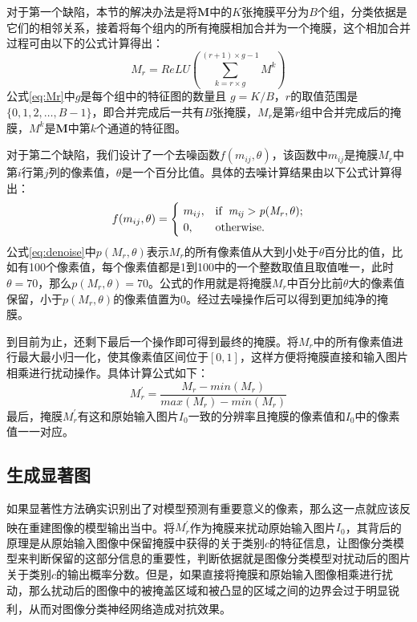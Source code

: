 对于第一个缺陷，本节的解决办法是将$\boldsymbol{M}$中的$K$张掩膜平分为$B$个组，分类依据是它们的相邻关系，接着将每个组内的所有掩膜相加合并为一个掩膜，这个相加合并过程可由以下的公式计算得出：
\begin{equation}
	M_r=ReLU(\sum_{k=r\times g}^{(r+1)\times g-1}{M^k})
	\label{eq:Mr}
\end{equation}
公式\ref{eq:Mr}中$g$是每个组中的特征图的数量且 $g=K/B$，$r$的取值范围是$\{0,1,2,\dots,B-1\}$，即合并完成后一共有$B$张掩膜，$M_r$是第$r$组中合并完成后的掩膜，$M^k$是$\boldsymbol{M}$中第$k$个通道的特征图。

对于第二个缺陷，我们设计了一个去噪函数$f(m_{ij},\theta)$，该函数中$m_{ij}$是掩膜$M_r$中第$i$行第$j$列的像素值，$\theta$是一个百分比值。具体的去噪计算结果由以下公式计算得出：
\begin{equation}
	f(m_{ij},\theta)= \begin{cases}
		\ m_{ij}, & \rm if \enspace \it m_{ij}>p(M_r,\theta) ; \\
		\ 0, & \rm otherwise .\\
	\end{cases}
\label{eq:denoise}
\end{equation}
公式\ref{eq:denoise}中$p(M_r,\theta)$表示$M_r$的所有像素值从大到小处于$\theta$百分比的值，比如有100个像素值，每个像素值都是1到100中的一个整数取值且取值唯一，此时$\theta =70$，那么$p(M_r,\theta)=70$。公式的作用就是将掩膜$M_r$中百分比前$\theta$大的像素值保留，小于$p(M_r,\theta)$的像素值置为0。经过去噪操作后可以得到更加纯净的掩膜。

到目前为止，还剩下最后一个操作即可得到最终的掩膜。将$M_r$中的所有像素值进行最大最小归一化，使其像素值区间位于$[0,1]$，这样方便将掩膜直接和输入图片相乘进行扰动操作。具体计算公式如下：
\begin{equation}
	M^{\prime}_r=\frac{M_r-min(M_r)}{max(M_r)-min(M_r)}\label{e_minmax}
\end{equation}
最后，掩膜$M^{\prime}_r$有这和原始输入图片$I_0$一致的分辨率且掩膜的像素值和$I_0$中的像素值一一对应。

\subsection{生成显著图}
如果显著性方法确实识别出了对模型预测有重要意义的像素，那么这一点就应该反映在重建图像的模型输出当中\textsuperscript{\cite{kapishnikov2019xrai}}。将$M^{\prime}_r$作为掩膜来扰动原始输入图片$I_0$，其背后的原理是从原始输入图像中保留掩膜中获得的关于类别$c$的特征信息，让图像分类模型来判断保留的这部分信息的重要性，判断依据就是图像分类模型对扰动后的图片关于类别$c$的输出概率分数。但是，如果直接将掩膜和原始输入图像相乘进行扰动，那么扰动后的图像中的被掩盖区域和被凸显的区域之间的边界会过于明显锐利，从而对图像分类神经网络造成对抗效果\textsuperscript{\cite{dabkowski2017real}}。


